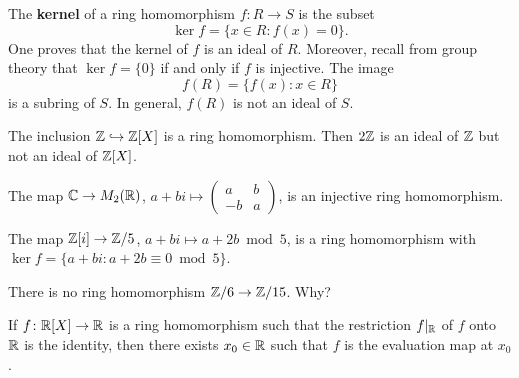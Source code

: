 The \textbf{kernel} of a ring homomorphism
$f\colon R\to S$ is the subset
\[
\ker f=\{x\in R:f(x)=0\}.
\]
One proves that the kernel of $f$ is an ideal of $R$.  
Moreover, recall from group theory that 
$\ker f=\{0\}$ if and only if $f$ is injective. The image 
\[
f(R)=\{f(x):x\in R\}
\]
is a subring of $S$. In general, $f(R)$ is not an ideal of $S$. 

\begin{example}
The inclusion $\mathbb{Z}\hookrightarrow\mathbb{Z}[X]$ is a ring homomorphism. Then
$2\mathbb{Z}$ is an ideal of $\mathbb{Z}$ but not an ideal of $\mathbb{Z}[X]$. 
\end{example}

\begin{example}
	The map $\mathbb{C}\to M_2(\mathbb{R})$, $a+bi\mapsto\begin{pmatrix}a&b\\-b&a\end{pmatrix}$, is an injective
	ring homomorphism. 	
\end{example}

\begin{example}
The map $\mathbb{Z}[i]\to\mathbb{Z}/5$, $a+bi\mapsto a+2b\bmod 5$, is a ring homomorphism 
with $\ker f=\{a+bi:a+2b\equiv 0\bmod 5\}$. 	
\end{example}

\begin{exercise}
There is no ring homomorphism $\mathbb{Z}/6\to\mathbb{Z}/15$. Why?	
\end{exercise}

\begin{exercise}
If $f\colon\mathbb{R}[X]\to\mathbb{R}$ is a ring homomorphism 
such that the restriction $f|_{\mathbb{R}}$ of 
$f$ onto $\mathbb{R}$ is the identity, then there exists $x_0\in\mathbb{R}$ such that 
$f$ is the evaluation map at $x_0$. 
\end{exercise}

